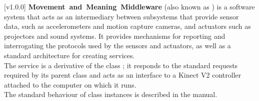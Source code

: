 [v1.0.0]
\textbf{Movement~and~Meaning~Middleware} (also known as \mplusm) is a software system
that acts as an intermediary between subsystems that provide sensor data, such as
accelerometers and motion capture cameras, and actuators such as projectors and sound
systems.
It provides mechanisms for reporting and interrogating the protocols used by the sensors
and actuators, as well as a standard architecture for creating services.\\

The \KVtwoI{} service is a derivative of the \mplusm{} class ;
it responds to the standard requests required by its parent class and acts as an interface
to a Kinect V2 controller attached to the computer on which it runs.\\

The standard behaviour of  class instances is described in
the \emph{\MMM} manual.
\primaryEnd{}
